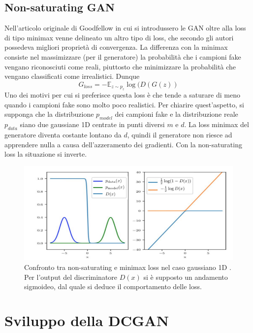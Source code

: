 \documentclass[Lau, noexaminfo, oneside]{sapthesis} %
\begin{document}
\section{Non-saturating GAN}
\label{Non-saturating GAN}
Nell'articolo originale di Goodfellow\cite{goodfellowgan} in cui si introdussero le GAN oltre alla loss di tipo minimax venne delineato un altro tipo di loss, che secondo gli autori possedeva migliori proprietà di convergenza.
La differenza con la minimax consiste nel massimizzare (per il generatore) la probabilità che i campioni fake vengano riconosciuti come reali, piuttosto che minimizzare la probabilità che vengano classificati come irrealistici. Dunque 
\begin{equation}
G_{loss} = - \mathbb{E}_{z \sim p_z} \log(D(G(z))
\end{equation}
Uno dei motivi per cui si preferisce questa loss è che tende a saturare di meno quando i campioni fake sono molto poco realistici. Per chiarire quest'aspetto, si supponga che la distribuzione $p_{model}$ dei campioni fake e la distribuzione reale $p_{data}$ siano due gaussiane 1D centrate in punti diversi $m$ e $d$. La loss minimax del generatore diventa costante lontano da $d$, quindi il generatore non riesce ad apprendere nulla a causa dell'azzeramento dei gradienti. Con la non-saturating loss la situazione si inverte.
\begin{figure}[H]
\includegraphics[scale=0.5]{non-saturating-GAN.png}
\centering
\caption{Confronto tra non-saturating e minimax loss nel caso gaussiano 1D \cite{manypathsgan}. Per l'output del discriminatore $D(x)$ si è supposto un andamento sigmoideo, dal quale si deduce il comportamento delle loss.}
\end{figure}
\chapter{Sviluppo della DCGAN}
\end{document}
